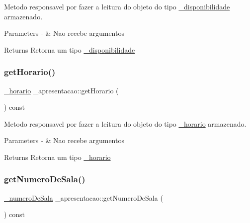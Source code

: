 Metodo responsavel por fazer a leitura do objeto do tipo \mbox{\hyperlink{class__disponibilidade}{\+\_\+disponibilidade}} armazenado. 


\begin{DoxyParams}{Parameters}
{\em -\/} & Nao recebe argumentos \\
\hline
\end{DoxyParams}
\begin{DoxyReturn}{Returns}
Retorna um tipo \mbox{\hyperlink{class__disponibilidade}{\+\_\+disponibilidade}} 
\end{DoxyReturn}
\mbox{\label{class__apresentacao_a6d8bad7be674d204bf8b429301849ab4}} 
\subsubsection{\texorpdfstring{getHorario()}{getHorario()}}
{\footnotesize\ttfamily \mbox{\hyperlink{class__horario}{\+\_\+horario}} \+\_\+apresentacao\+::get\+Horario (\begin{DoxyParamCaption}{ }\end{DoxyParamCaption}) const}



Metodo responsavel por fazer a leitura do objeto do tipo \mbox{\hyperlink{class__horario}{\+\_\+horario}} armazenado. 


\begin{DoxyParams}{Parameters}
{\em -\/} & Nao recebe argumentos \\
\hline
\end{DoxyParams}
\begin{DoxyReturn}{Returns}
Retorna um tipo \mbox{\hyperlink{class__horario}{\+\_\+horario}} 
\end{DoxyReturn}
\mbox{\label{class__apresentacao_a5a6b1255c1816a5b566e6ca9e3e0b097}} 
\subsubsection{\texorpdfstring{getNumeroDeSala()}{getNumeroDeSala()}}
{\footnotesize\ttfamily \mbox{\hyperlink{class__numero_de_sala}{\+\_\+numero\+De\+Sala}} \+\_\+apresentacao\+::get\+Numero\+De\+Sala (\begin{DoxyParamCaption}{ }\end{DoxyParamCaption}) const}



